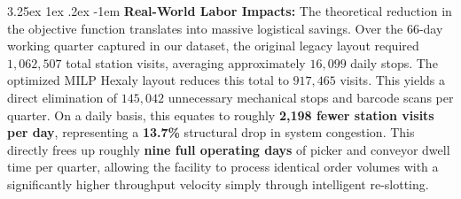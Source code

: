 \documentclass[preprint,review,11pt,authoryear]{elsarticle}
\makeatletter
\renewcommand\paragraph{\@startsection{paragraph}{4}{\z@}
  {3.25ex \@plus1ex \@minus.2ex}
  {-1em}
  {\normalfont\normalsize\itshape}}
\makeatother
\begin{document}

\paragraph{\textbf{Real-World Labor Impacts: }}
The theoretical reduction in the objective function translates into massive logistical savings. Over the 66-day working quarter captured in our dataset, the original legacy layout required $1,062,507$ total station visits, averaging approximately $16,099$ daily stops. The optimized MILP Hexaly layout reduces this total to $917,465$ visits. This yields a direct elimination of $145,042$ unnecessary mechanical stops and barcode scans per quarter. On a daily basis, this equates to roughly \textbf{2,198 fewer station visits per day}, representing a \textbf{13.7\%} structural drop in system congestion. This directly frees up roughly \textbf{nine full operating days} of picker and conveyor dwell time per quarter, allowing the facility to process identical order volumes with a significantly higher throughput velocity simply through intelligent re-slotting.

\end{document}
